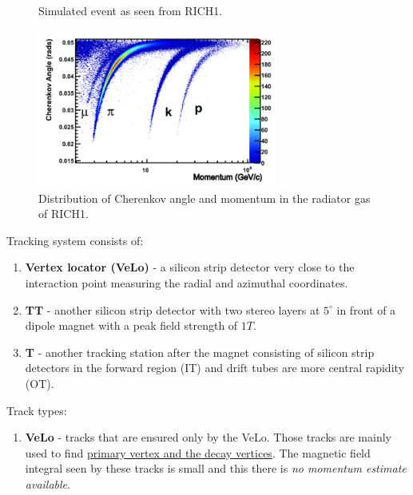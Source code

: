 \documentclass[11pt,a4paper,twoside]{article}
\begin{document}
\begin{enumerate}
\begin{figure}[H]
            \caption{Simulated event as seen from RICH1\cite{Bursche:2014ltl}.}
            \label{fig:007-RICH1-simulation}
        \end{figure}

        \begin{figure}[H]
            \centering

            \includegraphics[width=0.7\textwidth]{visuals/008-cherenkov-angle-distribution.png}
            
            \caption{Distribution of Cherenkov angle and momentum in the  radiator gas of RICH1\cite{Bursche:2014ltl}.}
            \label{fig:007-RICH1-simulation}
        \end{figure}



        Tracking system consists of:
        \begin{enumerate}
            \item \textbf{Vertex locator (VeLo)} - a silicon strip detector very close to the interaction point measuring the radial and azimuthal coordinates.

            \item \textbf{TT} - another silicon strip detector with two stereo layers at $5^\circ$  in front of a dipole magnet with a peak field strength of $1 T$.

            \item \textbf{T} - another tracking station after the magnet consisting of silicon strip detectors in the forward region (IT) and drift tubes are more central rapidity (OT).
        \end{enumerate}

        Track types:
        \begin{enumerate}
            \item \textbf{VeLo} - tracks that are ensured only by the VeLo. Those tracks are mainly used to find \underline{primary vertex and the decay vertices}. The magnetic field integral seen by these tracks is small and this there is \textit{no momentum estimate available}.
            

\end{enumerate}
\end{enumerate}
\end{document}
